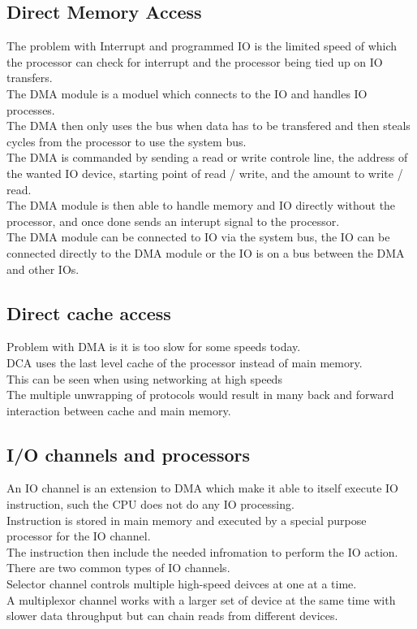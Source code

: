 \documentclass[12pt, a4paper]{article}
\begin{document}
		\subsection{Direct Memory Access}
			The problem with Interrupt and programmed IO is the limited speed of which the processor can check for interrupt and the processor being tied up on IO transfers.\\
			The DMA module is a moduel which connects to the IO and handles IO processes.\\
			The DMA then only uses the bus when data has to be transfered and then steals cycles from the processor to use the system bus.\\
			The DMA is commanded by sending a read or write controle line, the address of the wanted IO device, starting point of read / write, and the amount to write / read.\\
			The DMA module is then able to handle memory and IO directly without the processor, and once done sends an interupt signal to the processor.\\
			The DMA module can be connected to IO via the system bus, the IO can be connected directly to the DMA module or the IO is on a bus between the DMA and other IOs.\\
		\subsection{Direct cache access}
			Problem with DMA is it is too slow for some speeds today.\\
			DCA uses the last level cache of the processor instead of main memory.\\
			This can be seen when using networking at high speeds\\
			The multiple unwrapping of protocols would result in many back and forward interaction between cache and main memory.\\
		\subsection{I/O channels and processors}
			An IO channel is an extension to DMA which make it able to itself execute IO instruction, such the CPU does not do any IO processing.\\
			Instruction is stored in main memory and executed by a special purpose processor for the IO channel.\\
			The instruction then include the needed infromation to perform the IO action.\\
			There are two common types of IO channels.\\
			Selector channel controls multiple high-speed deivces at one at a time. \\
			A multiplexor channel works with a larger set of device at the same time with slower data throughput but can chain reads from different devices.
\end{document}
